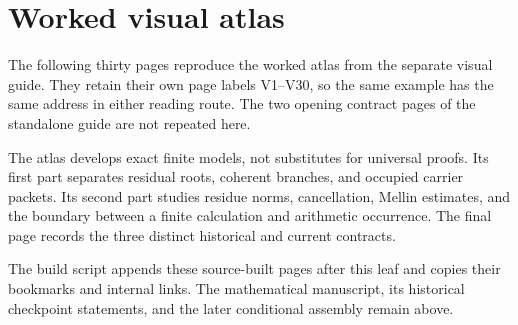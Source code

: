 \documentclass[11pt]{article}
\theoremstyle{definition}
\theoremstyle{remark}
\begin{document}


\clearpage
\section{Worked visual atlas}\label{sec:atlas}
The following thirty pages reproduce the worked atlas from the separate visual
guide. They retain their own page labels V1--V30, so the same example has the
same address in either reading route. The two opening contract pages of the
standalone guide are not repeated here.

The atlas develops exact finite models, not substitutes for universal proofs.
Its first part separates residual roots, coherent branches, and occupied carrier
packets. Its second part studies residue norms, cancellation, Mellin estimates,
and the boundary between a finite calculation and arithmetic occurrence.
The final page records the three distinct historical and current contracts.

The build script appends these source-built pages after this leaf and copies their
bookmarks and internal links. The mathematical manuscript, its historical
checkpoint statements, and the later conditional assembly remain above.
\end{document}
